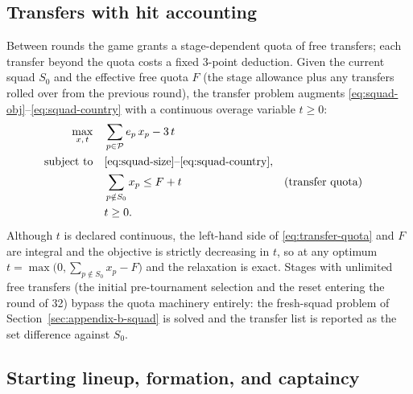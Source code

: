 \subsection{Transfers with hit accounting}
\label{sec:appendix-b-transfer}

Between rounds the game grants a stage-dependent quota of free
transfers; each transfer beyond the quota costs a fixed 3-point
deduction. Given the current squad $S_0$ and the effective free
quota $F$ (the stage allowance plus any transfers rolled over from
the previous round), the transfer problem augments
\eqref{eq:squad-obj}--\eqref{eq:squad-country} with a continuous
overage variable $t \ge 0$:
\begin{align}
\max_{x,\, t} \quad & \sum_{p \in \mathcal{P}} e_p \, x_p - 3\, t
  \label{eq:transfer-obj}\\
\text{subject to} \quad
& \eqref{eq:squad-size}\text{--}\eqref{eq:squad-country}, \nonumber\\
& \sum_{p \notin S_0} x_p \le F + t
  && \text{(transfer quota)} \label{eq:transfer-quota}\\
& t \ge 0. \nonumber
\end{align}
Although $t$ is declared continuous, the left-hand side of
\eqref{eq:transfer-quota} and $F$ are integral and the objective is
strictly decreasing in $t$, so at any optimum
$t = \max\bigl(0, \sum_{p \notin S_0} x_p - F\bigr)$ and the
relaxation is exact. Stages with unlimited free transfers (the
initial pre-tournament selection and the reset entering the round of
32) bypass the quota machinery entirely: the fresh-squad problem of
Section~\ref{sec:appendix-b-squad} is solved and the transfer list is
reported as the set difference against $S_0$.

\subsection{Starting lineup, formation, and captaincy}
\label{sec:appendix-b-lineup}

